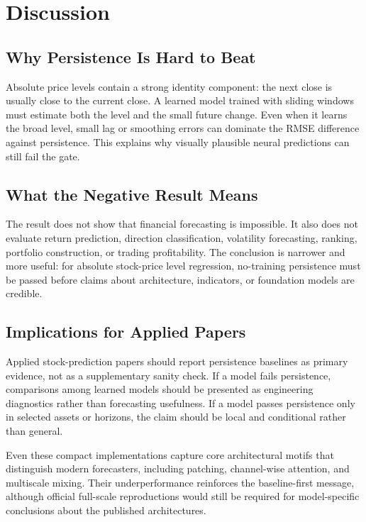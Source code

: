 \documentclass[11pt]{article}
\begin{document}
\section{Discussion}

\subsection{Why Persistence Is Hard to Beat}

Absolute price levels contain a strong identity component: the next close is usually close to the current close. A learned model trained with sliding windows must estimate both the level and the small future change. Even when it learns the broad level, small lag or smoothing errors can dominate the RMSE difference against persistence. This explains why visually plausible neural predictions can still fail the gate.

\subsection{What the Negative Result Means}

The result does not show that financial forecasting is impossible. It also does not evaluate return prediction, direction classification, volatility forecasting, ranking, portfolio construction, or trading profitability. The conclusion is narrower and more useful: for absolute stock-price level regression, no-training persistence must be passed before claims about architecture, indicators, or foundation models are credible.

\subsection{Implications for Applied Papers}

Applied stock-prediction papers should report persistence baselines as primary evidence, not as a supplementary sanity check. If a model fails persistence, comparisons among learned models should be presented as engineering diagnostics rather than forecasting usefulness. If a model passes persistence only in selected assets or horizons, the claim should be local and conditional rather than general.

Even these compact implementations capture core architectural motifs that distinguish modern forecasters, including patching, channel-wise attention, and multiscale mixing. Their underperformance reinforces the baseline-first message, although official full-scale reproductions would still be required for model-specific conclusions about the published architectures.
\end{document}
